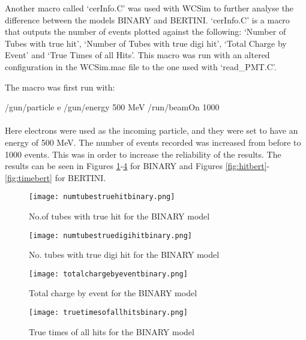 \documentclass[11pt,oneside,a4paper]{article}
\begin{document}
Another macro called `cerInfo.C' was used with WCSim to further analyse the difference between the models BINARY and BERTINI. `cerInfo.C' is a macro that outputs the number of events plotted against the following: `Number of Tubes with true hit', `Number of Tubes with true digi hit', `Total Charge by Event' and `True Times of all Hits'. 
This macro was run with an altered configuration in the WCSim.mac file to the one used with `read{\_}PMT.C'.

The macro was first run with:

\noindent/gun/particle e
\newline 
/gun/energy 500 MeV
\newline 
/run/beamOn 1000
\paragraph{}

Here electrons were used as the incoming particle, and they were set to have an energy of 500 MeV. The number of events recorded was increased from before to 1000 events. This was in order to increase the reliability of the results. The results can be seen in Figures \ref{fig:hitbin}-\ref{fig:timebin} for BINARY and Figures \ref{fig:hitbert}-\ref{fig:timebert} for BERTINI.

\begin{figure}
	\centering
		\captionsetup{justification=centering}
		\texttt{[image: numtubestruehitbinary.png]}
		\caption{No.of tubes with true hit for the BINARY model}
		\label{fig:hitbin}
\end{figure}
\begin{figure}
		\centering
		\captionsetup{justification=centering}
		\texttt{[image: numtubestruedigihitbinary.png]}
		\caption{No. tubes with true digi hit for the BINARY model}
		\label{fig:digihitbin}
	\end{figure}
	
\begin{figure}
	\centering
	\captionsetup{justification=centering}
	\texttt{[image: totalchargebyeventbinary.png]}
	\caption{Total charge by event for the BINARY model}
	\label{fig:qbin}
\end{figure}
\begin{figure}
	\centering
	\captionsetup{justification=centering}
	\texttt{[image: truetimesofallhitsbinary.png]}
	\caption{True times of all hits for the BINARY model}
	\label{fig:timebin}
\end{figure}
\end{document}
